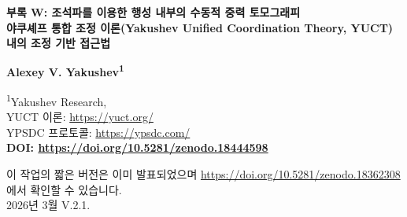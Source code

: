 \documentclass[12pt,a4paper]{article}
\theoremstyle{remark}
\begin{document}
	
	\begin{titlepage}
		\begin{center}
			\vspace*{1cm}
			
			{\Huge\textbf{부록 W: 조석파를 이용한 행성 내부의 수동적 중력 토모그래피}} \\
			\vspace{0.5cm}
			{\Large\textbf{야쿠셰프 통합 조정 이론(Yakushev Unified Coordination Theory, YUCT) 내의 조정 기반 접근법}}
			
			\vspace{1.5cm}
			
			{\Large\textbf{Alexey V. Yakushev\textsuperscript{1}}}
			
			\vspace{0.3cm}
			\large
			\textsuperscript{1}Yakushev Research, \\
			YUCT 이론: \url{https://yuct.org/}\\
			YPSDC 프로토콜: \url{https://ypsdc.com/}\\
			
			
			\vspace{2cm}
			\textbf{DOI: \url{https://doi.org/10.5281/zenodo.18444598}}\\
			
			\vspace{1cm}
			
			\large 
			이 작업의 짧은 버전은 이미 발표되었으며 \url{https://doi.org/10.5281/zenodo.18362308} 에서 확인할 수 있습니다.\\
			\vspace{1cm}
			2026년 3월 \quad \large V.2.1.
			
			\vspace{2cm}
			

\end{center}
\end{titlepage}
\end{document}
